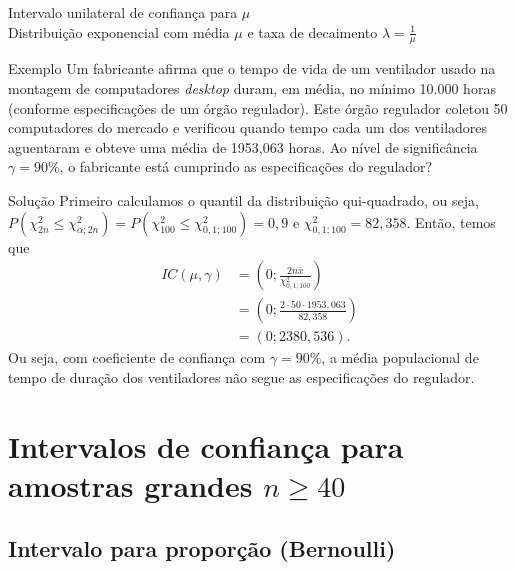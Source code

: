 \documentclass[8pt]{beamer}
\begin{document}
\begin{frame}{Intervalo unilateral de confiança para $\mu$\\ Distribuição exponencial com média $\mu$ e taxa de decaimento $\lambda=\frac{1}{\mu}$}

\small

\begin{block}{Exemplo}
	Um fabricante afirma que o tempo de vida de um ventilador usado na montagem de computadores \textit{desktop} duram, em média, no mínimo 10.000 horas (conforme especificações de um órgão regulador). Este órgão regulador coletou 50 computadores do mercado e verificou quando tempo cada um dos ventiladores aguentaram e obteve uma média de 1953,063 horas. Ao nível de significância $\gamma=90\%$, o fabricante está cumprindo as especificações do regulador?
\end{block}

\begin{block}{Solução}
	Primeiro calculamos o quantil da distribuição qui-quadrado, ou seja, $P(\chi^2_{2n} \leq \chi_{\alpha;2n}^{2}) = P(\chi^2_{100} \leq \chi_{0,1;100}^{2}) = 0,9$ e $\chi_{0,1;100}^{2} = 82,358$. Então, temos que
	\begin{align*}
		IC(\mu, \gamma) &= \left( 0; \frac{2 n \bar{x}}{\chi_{0,1;100}^{2}} \right)\\
		&= \left( 0; \frac{2 \cdot 50\cdot 1953,063}{82,358} \right)\\
		&= \left( 0; 2380,536 \right).
	\end{align*}
	Ou seja, com coeficiente de confiança com $\gamma=90\%$, a média populacional de tempo de duração dos ventiladores não segue as especificações do regulador.
\end{block}

\normalsize

\end{frame}

\section{Intervalos de confiança para amostras grandes $n \geq 40$}

\subsection{Intervalo para proporção (Bernoulli)}
\end{document}
